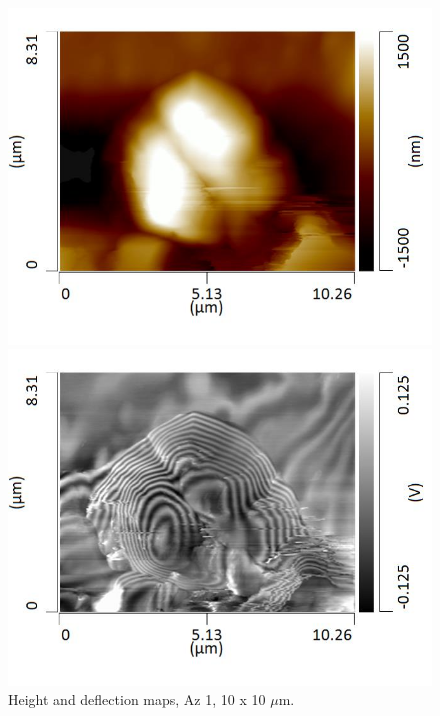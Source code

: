\begin{figure}[H]
\centering
\begin{minipage}{.45\textwidth}
  \centering
  \includegraphics[width=\linewidth]{Az1_tapping_mode_240521_height_3}
\end{minipage}
\begin{minipage}{.45\textwidth}
  \centering
  \includegraphics[width=\linewidth]{Az1_tapping_mode_240521_def_3}
\end{minipage}
\caption[Height and deflection maps, Az 1]{Height and deflection maps, Az 1, 10 x 10 $\mu$m.}
\label{fig:afm_az1_height_def_8}
\end{figure}

